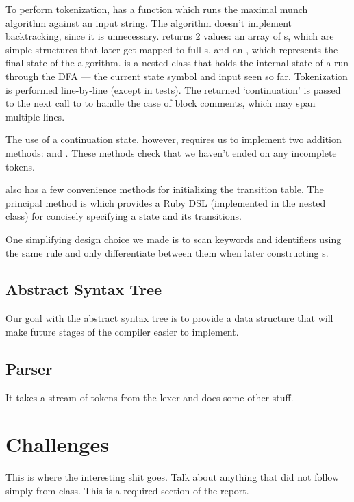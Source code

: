\documentclass[pdftex,11pt,a4paper]{article}
\begin{document}
To perform tokenization,  has a function 
which runs the maximal munch algorithm against an input string. The
algorithm doesn't implement backtracking, since it is unnecessary.
 returns 2 values: an array of s, which
are simple structures that later get mapped to full s,
and an , which represents the final state of the
algorithm.  is a nested class that holds the internal
state of a run through the DFA --- the current state symbol and input seen so
far. Tokenization is performed line-by-line (except in tests). The
returned  `continuation' is passed to the next
call to  to handle the case of block comments, which may
span multiple lines.

The use of a continuation state, however, requires us to implement two
addition  methods:  and
. These methods check that we haven't
ended on any incomplete tokens.

 also has a few convenience methods for initializing the
transition table. The principal method is  which provides a
Ruby DSL (implemented in the  nested class) for
concisely specifying a state and its transitions.

One simplifying design choice we made is to scan keywords and identifiers
using the same rule and only differentiate between them when later
constructing s.

\subsection{Abstract Syntax Tree}

Our goal with the abstract syntax tree is to provide a data structure
that will make future stages of the compiler easier to implement.


\subsection{Parser}

It takes a stream of tokens from the lexer and does some other stuff.


\section{Challenges}


This is where the interesting shit goes. Talk about anything that did
not follow simply from class. This is a required section of the report.
\end{document}
